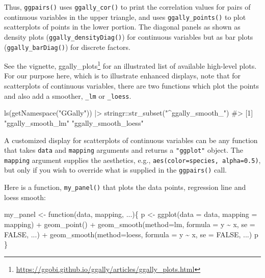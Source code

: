 \documentclass[
  letterpaper,
  10pt,
  krantz2]{krantz}
\makeatletter
\newenvironment{Shaded}{\begin{snugshade}}{\end{snugshade}}
\newcommand{\AttributeTok}[1]{\textcolor[rgb]{0.40,0.45,0.13}{#1}}
\newcommand{\CommentTok}[1]{\textcolor[rgb]{0.37,0.37,0.37}{#1}}
\newcommand{\ConstantTok}[1]{\textcolor[rgb]{0.56,0.35,0.01}{#1}}
\newcommand{\ControlFlowTok}[1]{\textcolor[rgb]{0.00,0.23,0.31}{#1}}
\newcommand{\FunctionTok}[1]{\textcolor[rgb]{0.28,0.35,0.67}{#1}}
\newcommand{\NormalTok}[1]{\textcolor[rgb]{0.00,0.23,0.31}{#1}}
\newcommand{\OtherTok}[1]{\textcolor[rgb]{0.00,0.23,0.31}{#1}}
\newcommand{\SpecialCharTok}[1]{\textcolor[rgb]{0.37,0.37,0.37}{#1}}
\newcommand{\StringTok}[1]{\textcolor[rgb]{0.13,0.47,0.30}{#1}}
\providecommand{\href}[2]{#2\footnote{\url{#1}}}
\newenvironment{kframe}{%
  \medskip{}
  \setlength{\fboxsep}{.8em}
  \def\at@end@of@kframe{}%
  \ifinner\ifhmode%
  \def\at@end@of@kframe{\end{minipage}}%
  \begin{minipage}{\columnwidth}%
  \fi\fi%
  \def\FrameCommand##1{\hskip\@totalleftmargin \hskip-\fboxsep
  \colorbox{shadecolor}{##1}\hskip-\fboxsep
      \hskip-\linewidth \hskip-\@totalleftmargin \hskip\columnwidth}%
  \MakeFramed {\advance\hsize-\width
    \@totalleftmargin\z@ \linewidth\hsize
    \@setminipage}}%
{\par\unskip\endMakeFramed%
  \at@end@of@kframe}
\renewenvironment{Shaded}{\begin{kframe}}{\end{kframe}}
\makeatother
\begin{document}
Thus, \texttt{ggpairs()} uses \texttt{ggally\_cor()} to print the
correlation values for pairs of continuous variables in the upper
triangle, and uses \texttt{ggally\_points()} to plot scatterplots of
points in the lower portion. The diagonal panels as shown as density
plots (\texttt{ggally\_densityDiag()}) for continuous variables but as
bar plots (\texttt{ggally\_barDiag()}) for discrete factors.

See the vignette,
\href{https://ggobi.github.io/ggally/articles/ggally_plots.html}{ggally\_plots}
for an illustrated list of available high-level plots. For our purpose
here, which is to illustrate enhanced displays, note that for
scatterplots of continuous variables, there are two functions which plot
the points and also add a smoother, \texttt{\_lm} or \texttt{\_loess}.

\begin{Shaded}
\begin{Highlighting}[]
\FunctionTok{ls}\NormalTok{(}\FunctionTok{getNamespace}\NormalTok{(}\StringTok{"GGally"}\NormalTok{)) }\SpecialCharTok{|\textgreater{}} 
\NormalTok{  stringr}\SpecialCharTok{::}\FunctionTok{str\_subset}\NormalTok{(}\StringTok{"\^{}ggally\_smooth\_"}\NormalTok{)}
\CommentTok{\#\textgreater{} [1] "ggally\_smooth\_lm"    "ggally\_smooth\_loess"}
\end{Highlighting}
\end{Shaded}

A customized display for scatterplots of continuous variables can be any
function that takes \texttt{data} and \texttt{mapping} arguments and
returns a \texttt{"ggplot"} object. The \texttt{mapping} argument
supplies the aesthetics, e.g., \texttt{aes(color=species,\ alpha=0.5)},
but only if you wish to override what is supplied in the
\texttt{ggpairs()} call.

Here is a function, \texttt{my\_panel()} that plots the data points,
regression line and loess smooth:

\begin{Shaded}
\begin{Highlighting}[]
\NormalTok{my\_panel }\OtherTok{\textless{}{-}} \ControlFlowTok{function}\NormalTok{(data, mapping, ...)\{}
\NormalTok{  p }\OtherTok{\textless{}{-}} \FunctionTok{ggplot}\NormalTok{(}\AttributeTok{data =}\NormalTok{ data, }\AttributeTok{mapping =}\NormalTok{ mapping) }\SpecialCharTok{+} 
    \FunctionTok{geom\_point}\NormalTok{() }\SpecialCharTok{+} 
    \FunctionTok{geom\_smooth}\NormalTok{(}\AttributeTok{method=}\NormalTok{lm, }\AttributeTok{formula =}\NormalTok{ y }\SpecialCharTok{\textasciitilde{}}\NormalTok{ x, }\AttributeTok{se =} \ConstantTok{FALSE}\NormalTok{, ...) }\SpecialCharTok{+}
    \FunctionTok{geom\_smooth}\NormalTok{(}\AttributeTok{method=}\NormalTok{loess, }\AttributeTok{formula =}\NormalTok{ y }\SpecialCharTok{\textasciitilde{}}\NormalTok{ x, }\AttributeTok{se =} \ConstantTok{FALSE}\NormalTok{, ...)}
\NormalTok{  p}
\NormalTok{\}}
\end{Highlighting}
\end{Shaded}
\end{document}
